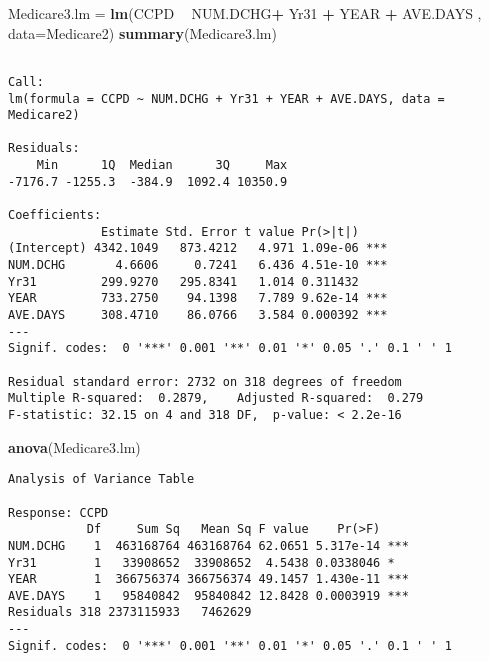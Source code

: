 \documentclass[]{book}
\newenvironment{Shaded}{\begin{snugshade}}{\end{snugshade}}
\newcommand{\DataTypeTok}[1]{\textcolor[rgb]{0.13,0.29,0.53}{#1}}
\newcommand{\KeywordTok}[1]{\textcolor[rgb]{0.13,0.29,0.53}{\textbf{#1}}}
\newcommand{\NormalTok}[1]{#1}
\newcommand{\OperatorTok}[1]{\textcolor[rgb]{0.81,0.36,0.00}{\textbf{#1}}}
\newcommand{\StringTok}[1]{\textcolor[rgb]{0.31,0.60,0.02}{#1}}
\begin{document}
\begin{Shaded}
\begin{Highlighting}[]
\NormalTok{Medicare3.lm =}\StringTok{ }\KeywordTok{lm}\NormalTok{(CCPD }\OperatorTok{~}\StringTok{ }\NormalTok{NUM.DCHG}\OperatorTok{+}\StringTok{ }\NormalTok{Yr31 }\OperatorTok{+}\StringTok{ }\NormalTok{YEAR }\OperatorTok{+}\StringTok{ }\NormalTok{AVE.DAYS , }\DataTypeTok{data=}\NormalTok{Medicare2)}
\KeywordTok{summary}\NormalTok{(Medicare3.lm)}
\end{Highlighting}
\end{Shaded}

\begin{verbatim}

Call:
lm(formula = CCPD ~ NUM.DCHG + Yr31 + YEAR + AVE.DAYS, data = Medicare2)

Residuals:
    Min      1Q  Median      3Q     Max 
-7176.7 -1255.3  -384.9  1092.4 10350.9 

Coefficients:
             Estimate Std. Error t value Pr(>|t|)    
(Intercept) 4342.1049   873.4212   4.971 1.09e-06 ***
NUM.DCHG       4.6606     0.7241   6.436 4.51e-10 ***
Yr31         299.9270   295.8341   1.014 0.311432    
YEAR         733.2750    94.1398   7.789 9.62e-14 ***
AVE.DAYS     308.4710    86.0766   3.584 0.000392 ***
---
Signif. codes:  0 '***' 0.001 '**' 0.01 '*' 0.05 '.' 0.1 ' ' 1

Residual standard error: 2732 on 318 degrees of freedom
Multiple R-squared:  0.2879,    Adjusted R-squared:  0.279 
F-statistic: 32.15 on 4 and 318 DF,  p-value: < 2.2e-16
\end{verbatim}

\begin{Shaded}
\begin{Highlighting}[]
\KeywordTok{anova}\NormalTok{(Medicare3.lm)}
\end{Highlighting}
\end{Shaded}

\begin{verbatim}
Analysis of Variance Table

Response: CCPD
           Df     Sum Sq   Mean Sq F value    Pr(>F)    
NUM.DCHG    1  463168764 463168764 62.0651 5.317e-14 ***
Yr31        1   33908652  33908652  4.5438 0.0338046 *  
YEAR        1  366756374 366756374 49.1457 1.430e-11 ***
AVE.DAYS    1   95840842  95840842 12.8428 0.0003919 ***
Residuals 318 2373115933   7462629                      
---
Signif. codes:  0 '***' 0.001 '**' 0.01 '*' 0.05 '.' 0.1 ' ' 1
\end{verbatim}
\end{document}
